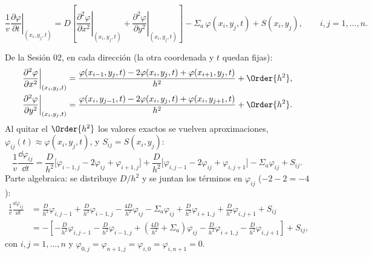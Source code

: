 \[
  \frac1v\left.\frac{\partial\varphi}{\partial t}\right|_{(x_i, y_j, t)}
  = D\left[\left.\frac{\partial^2\varphi}{\partial x^2}\right|_{(x_i, y_j, t)}
         + \left.\frac{\partial^2\varphi}{\partial y^2}\right|_{(x_i, y_j, t)}\right]
  - \Sigma_a\,\varphi(x_i, y_j, t) + S(x_i, y_j),
  \qquad i, j = 1, \dots, n .
\]

De la Sesión 02, en cada dirección (la otra coordenada y $t$ quedan fijas):
\begin{align*}
  \left.\frac{\partial^2\varphi}{\partial x^2}\right|_{(x_i, y_j, t)}
  &= \frac{\varphi(x_{i-1}, y_j, t) - 2\varphi(x_i, y_j, t) + \varphi(x_{i+1}, y_j, t)}{h^2} + \Order{h^2},\\
  \left.\frac{\partial^2\varphi}{\partial y^2}\right|_{(x_i, y_j, t)}
  &= \frac{\varphi(x_i, y_{j-1}, t) - 2\varphi(x_i, y_j, t) + \varphi(x_i, y_{j+1}, t)}{h^2} + \Order{h^2}.
\end{align*}
Al quitar el $\Order{h^2}$ los valores exactos se vuelven aproximaciones,
$\varphi_{ij}(t) \approx \varphi(x_i, y_j, t)$, y $S_{ij} = S(x_i, y_j)$:
\[
  \frac1v\frac{\dd\varphi_{ij}}{\dd t}
  = \frac{D}{h^2}\big[\varphi_{i-1,j} - 2\varphi_{ij} + \varphi_{i+1,j}\big]
  + \frac{D}{h^2}\big[\varphi_{i,j-1} - 2\varphi_{ij} + \varphi_{i,j+1}\big]
  - \Sigma_a\varphi_{ij} + S_{ij}.
\]
Parte algebraica: se distribuye $D/h^2$ y se juntan los términos en $\varphi_{ij}$
($-2 - 2 = -4$):
\begin{align*}
  \frac1v\frac{\dd\varphi_{ij}}{\dd t}
  &= \frac{D}{h^2}\varphi_{i,j-1} + \frac{D}{h^2}\varphi_{i-1,j} - \frac{4D}{h^2}\varphi_{ij} - \Sigma_a\varphi_{ij}
     + \frac{D}{h^2}\varphi_{i+1,j} + \frac{D}{h^2}\varphi_{i,j+1} + S_{ij}\\
  &= -\left[-\frac{D}{h^2}\varphi_{i,j-1} - \frac{D}{h^2}\varphi_{i-1,j}
     + \left(\frac{4D}{h^2} + \Sigma_a\right)\varphi_{ij}
     - \frac{D}{h^2}\varphi_{i+1,j} - \frac{D}{h^2}\varphi_{i,j+1}\right] + S_{ij},
\end{align*}
con $i, j = 1, \dots, n$ y $\varphi_{0,j} = \varphi_{n+1,j} = \varphi_{i,0} = \varphi_{i,n+1} = 0$.

